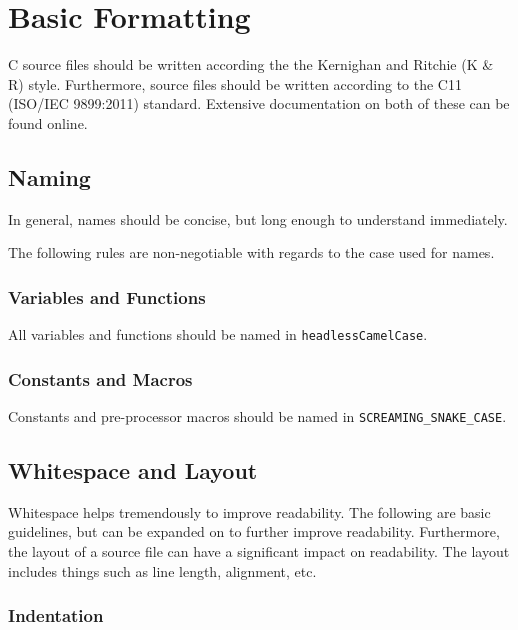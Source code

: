 \documentclass[StyleGuide.tex]{subfiles}
\begin{document}
\chapter{Basic Formatting}\label{ch:basic-formatting}

C source files should be written according the the Kernighan and Ritchie
(K \& R) style. Furthermore, source files should be written according to
the C11 (ISO/IEC 9899:2011) standard. Extensive documentation on both of
these can be found online.

\section{Naming}\label{sec:naming}

In general, names should be concise, but long enough to understand
immediately.

The following rules are non-negotiable with regards to the case used for
names.

\subsection{Variables and Functions}\label{subsec:variables-and-functions}

All variables and functions should be named in
\texttt{headlessCamelCase}.

\subsection{Constants and Macros}\label{subsec:constants-and-macros}

Constants and pre-processor macros should be named in
\texttt{SCREAMING\_SNAKE\_CASE}.

\section{Whitespace and Layout}\label{sec:whitespace}

Whitespace helps tremendously to improve readability. The following are
basic guidelines, but can be expanded on to further improve readability.
Furthermore, the layout of a source file can have a significant impact
on readability. The layout includes things such as line length, alignment,
etc.

\subsection{Indentation}\label{subsec:indentation}
\end{document}
